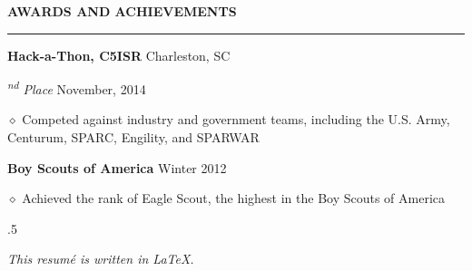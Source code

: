 \documentclass[executivepaper]{extarticle}
\begin{document}
\begin{center}
{\begin{minipage}{7.0in}
{\noindent \textbf{\fontsize{12}{9}\selectfont AWARDS AND ACHIEVEMENTS}}

\vspace{-3mm}

\noindent \rule{\textwidth}{0.5pt}

\vspace{1mm}

{\noindent \textbf{\fontsize{12}{8}\selectfont Hack-a-Thon, C5ISR}} {\hfill \fontsize{10}{8}\selectfont Charleston, SC}

{\noindent \textit{\fontsize{12}{8}\textsuperscript{nd} Place}} {\hfill \fontsize{10}{8}\selectfont November, 2014}

\vspace{0.25mm}

{\noindent $\diamond$ {\fontsize{12}{8}\selectfont Competed against industry and government teams, including the U.S. Army, Centurum, SPARC, Engility, and SPARWAR}}

\vspace{2mm}

{\noindent \textbf{\fontsize{12}{8}\selectfont Boy Scouts of America}} {\hfill \fontsize{10}{8}\selectfont Winter 2012}

\vspace{0.25mm}

{\noindent $\diamond$ {\fontsize{12}{8}\selectfont Achieved the rank of Eagle Scout, the highest in the Boy Scouts of America}}

\vspace{5mm}



\moveleft.5\hoffset\centerline{{\large\sl This resumé is written in \LaTeX.}}

\end{minipage}

}

\end{center}
\end{document}
